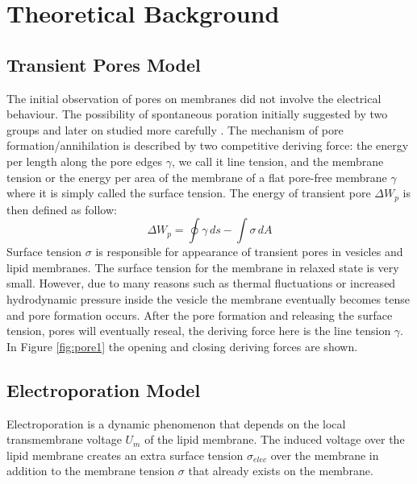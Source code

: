 \documentclass[english,12pt]{article}
\begin{document}
\section{Theoretical Background}
\subsection{Transient Pores Model}
The initial observation of pores on membranes did not involve the electrical behaviour. The possibility of spontaneous poration initially suggested by two groups and later on studied more carefully  \citep{Sandre, karatekin2003cascades}. The mechanism of pore formation/annihilation is described by two competitive deriving force: the energy per length along the pore edges $\gamma$, we call it line tension, and the membrane tension or the energy per area of the membrane of a flat pore-free membrane $\gamma$ where it is simply called the surface tension. The energy of transient pore $\Delta W_{p}$ is then defined as follow:
\begin{equation}
	\Delta W_{p} = \oint\gamma\,ds - \int\sigma\,dA
	\label{eqn:transientmodel}
\end{equation}
Surface tension $\sigma$ is responsible for appearance of transient pores in vesicles and lipid membranes. The surface tension for the membrane in relaxed state is very small. However, due to many reasons such as thermal fluctuations or increased hydrodynamic pressure inside the vesicle the membrane eventually becomes tense and pore formation occurs. After the pore formation and releasing the surface tension, pores will eventually reseal, the deriving force here is the line tension $\gamma$. In Figure \ref{fig:pore1} the opening and closing deriving forces are shown.


\subsection{Electroporation Model}
Electroporation is a dynamic phenomenon that depends on the local transmembrane voltage $U_{m}$ of the lipid membrane. The induced voltage over the lipid membrane creates an extra surface tension $\sigma_{elec}$ over the membrane in addition to the membrane tension $\sigma$ that already exists on the membrane. 
\end{document}
